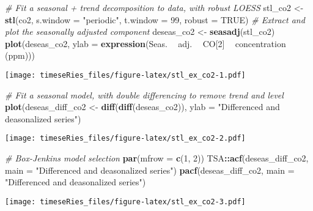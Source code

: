 \documentclass[]{book}
\newenvironment{Shaded}{\begin{snugshade}}{\end{snugshade}}
\newcommand{\KeywordTok}[1]{\textcolor[rgb]{0.13,0.29,0.53}{\textbf{#1}}}
\newcommand{\DataTypeTok}[1]{\textcolor[rgb]{0.13,0.29,0.53}{#1}}
\newcommand{\DecValTok}[1]{\textcolor[rgb]{0.00,0.00,0.81}{#1}}
\newcommand{\StringTok}[1]{\textcolor[rgb]{0.31,0.60,0.02}{#1}}
\newcommand{\CommentTok}[1]{\textcolor[rgb]{0.56,0.35,0.01}{\textit{#1}}}
\newcommand{\OtherTok}[1]{\textcolor[rgb]{0.56,0.35,0.01}{#1}}
\newcommand{\OperatorTok}[1]{\textcolor[rgb]{0.81,0.36,0.00}{\textbf{#1}}}
\newcommand{\NormalTok}[1]{#1}
\begin{document}
\begin{Shaded}
\begin{Highlighting}[]
\CommentTok{# Fit a seasonal + trend decomposition to data, with robust LOESS}
\NormalTok{stl_co2 <-}\StringTok{ }\KeywordTok{stl}\NormalTok{(co2, }\DataTypeTok{s.window =} \StringTok{"periodic"}\NormalTok{, }\DataTypeTok{t.window =} \DecValTok{99}\NormalTok{, }\DataTypeTok{robust =} \OtherTok{TRUE}\NormalTok{)}
\CommentTok{# Extract and plot the seasonally adjusted component}
\NormalTok{deseas_co2 <-}\StringTok{ }\KeywordTok{seasadj}\NormalTok{(stl_co2)}
\KeywordTok{plot}\NormalTok{(deseas_co2, }\DataTypeTok{ylab =} \KeywordTok{expression}\NormalTok{(Seas. }\OperatorTok{~}\StringTok{ }\NormalTok{adj. }\OperatorTok{~}\StringTok{ }\NormalTok{CO[}\DecValTok{2}\NormalTok{] }\OperatorTok{~}\StringTok{ }\NormalTok{concentration }\OperatorTok{~}\StringTok{ }\NormalTok{(ppm)))}
\end{Highlighting}
\end{Shaded}

\texttt{[image: timeseRies\_files/figure-latex/stl\_ex\_co2-1.pdf]}

\begin{Shaded}
\begin{Highlighting}[]
\CommentTok{# Fit a seasonal model, with double differencing to remove trend and level}
\KeywordTok{plot}\NormalTok{(deseas_diff_co2 <-}\StringTok{ }\KeywordTok{diff}\NormalTok{(}\KeywordTok{diff}\NormalTok{(deseas_co2)), }\DataTypeTok{ylab =} \StringTok{"Differenced and deasonalized series"}\NormalTok{)}
\end{Highlighting}
\end{Shaded}

\texttt{[image: timeseRies\_files/figure-latex/stl\_ex\_co2-2.pdf]}

\begin{Shaded}
\begin{Highlighting}[]
\CommentTok{# Box-Jenkins model selection}
\KeywordTok{par}\NormalTok{(}\DataTypeTok{mfrow =} \KeywordTok{c}\NormalTok{(}\DecValTok{1}\NormalTok{, }\DecValTok{2}\NormalTok{))}
\NormalTok{TSA}\OperatorTok{::}\KeywordTok{acf}\NormalTok{(deseas_diff_co2, }\DataTypeTok{main =} \StringTok{"Differenced and deasonalized series"}\NormalTok{)}
\KeywordTok{pacf}\NormalTok{(deseas_diff_co2, }\DataTypeTok{main =} \StringTok{"Differenced and deasonalized series"}\NormalTok{)}
\end{Highlighting}
\end{Shaded}

\texttt{[image: timeseRies\_files/figure-latex/stl\_ex\_co2-3.pdf]}
\end{document}
